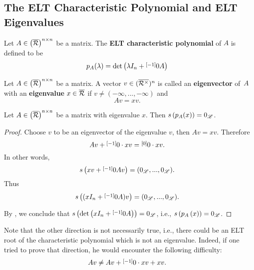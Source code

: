 \subsection{The ELT Characteristic Polynomial and ELT Eigenvalues}
\begin{defn}
Let $A\in \left(\overline{\R}\right)^{n\times n}$ be a matrix. The \textbf{ELT characteristic polynomial} of $A$ is defined to be
$$p_A(\lambda)=\det\left(\lambda I_n+\layer{0}{-1}A\right)$$
\end{defn}

\begin{defn}
Let $A\in \left(\overline{\R}\right)^{n\times n}$ be a matrix. A vector $v\in (\overline{\R^{\times}})^n$ is called an \textbf{eigenvector} of~$A$ with an \textbf{eigenvalue} $x\in\overline{\R}$ if $v\neq (-\infty,...,-\infty)$ and
$$Av=xv.$$
\end{defn}


\begin{prop}
Let $A\in \left(\overline{\R}\right)^{n\times n}$ be a matrix with eigenvalue $x$. Then $s\left(p_A(x)\right)=0_{\L}$.
\end{prop}

\begin{proof}
Choose $v$ to be an eigenvector of the eigenvalue $v$, then $Av=xv$. Therefore
$$Av+\layer{0}{-1}\cdot xv = \layer{0}{0}\cdot xv.$$
In other words,
$$s\left(xv+\layer{0}{-1}Av\right)=(0_{\L},...,0_{\L}).$$
Thus
$$s\left((xI_n+\layer{0}{-1}A)v\right)=(0_{\L},...,0_{\L}).$$

By , we conclude that $s\left(\det\left(xI_n+\layer{0}{-1}A\right)\right)=0_{\L}$, i.e., $s\left(p_A\left(x\right)\right)=0_{\L}$.
\end{proof}

Note that the other direction is not necessarily true, i.e., there could be an ELT root of the characteristic polynomial which is not an eigenvalue. Indeed, if one tried to prove that direction, he would encounter the following difficulty:
$$Av \neq Av+\layer{0}{-1}\cdot xv + xv.$$

